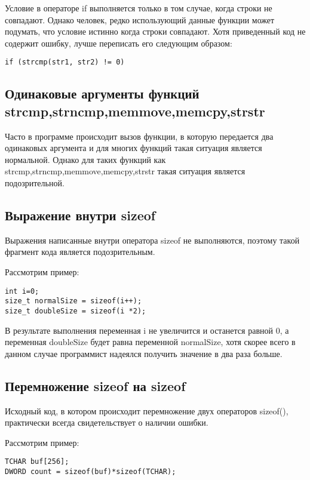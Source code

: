 Условие в операторе if выполняется только в том случае, когда строки не совпадают. Однако человек,
редко использующий данные функции может подумать, что условие истинно когда строки совпадают.
Хотя приведенный код не содержит ошибку, лучше переписать его следующим образом:
\begin{lstlisting}
if (strcmp(str1, str2) != 0)
\end{lstlisting}

\subsection{Одинаковые аргументы функций strcmp,strncmp,memmove,memcpy,strstr}
\label{sec:eqArgs}
Часто в программе происходит вызов функции, в которую передается два одинаковых аргумента и для
многих функций такая ситуация является нормальной. Однако для таких функций как strcmp,strncmp,memmove,memcpy,strstr
такая ситуация является подозрительной.

\subsection{Выражение внутри sizeof}
\label{sec:sizeof}
Выражения написанные внутри оператора sizeof не выполняются, поэтому такой фрагмент кода является подозрительным.

Рассмотрим пример:
\begin{lstlisting}
int i=0;
size_t normalSize = sizeof(i++);
size_t doubleSize = sizeof(i *2);
\end{lstlisting}

В результате выполнения переменная i не увеличится и останется равной 0, а переменная doubleSize
будет равна переменной normalSize, хотя скорее всего в данном случае программист надеялся получить
значение в два раза больше. 

\subsection{Перемножение sizeof на sizeof}
\label{sec:sizeofMul}
Исходный код, в котором происходит перемножение двух операторов sizeof(), практически всегда
свидетельствует о наличии ошибки.

Рассмотрим пример:
\begin{lstlisting}
TCHAR buf[256];
DWORD count = sizeof(buf)*sizeof(TCHAR);
\end{lstlisting}

